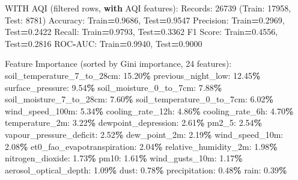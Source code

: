 \documentclass[
  letterpaper,
  DIV=11,
  numbers=noendperiod]{scrartcl}
\newenvironment{Shaded}{\begin{snugshade}}{\end{snugshade}}
\newcommand{\BuiltInTok}[1]{#1}
\newcommand{\ControlFlowTok}[1]{\textcolor[rgb]{0.13,0.29,0.53}{\textbf{#1}}}
\newcommand{\DecValTok}[1]{\textcolor[rgb]{0.00,0.00,0.81}{#1}}
\newcommand{\FloatTok}[1]{\textcolor[rgb]{0.00,0.00,0.81}{#1}}
\newcommand{\NormalTok}[1]{#1}
\newcommand{\OperatorTok}[1]{\textcolor[rgb]{0.81,0.36,0.00}{\textbf{#1}}}
\begin{document}
\begin{Shaded}
\begin{Highlighting}[]
\NormalTok{WITH AQI (filtered rows, }\ControlFlowTok{with}\NormalTok{ AQI features):}
\NormalTok{  Records: }\DecValTok{26739}\NormalTok{ (Train: }\DecValTok{17958}\NormalTok{, Test: }\DecValTok{8781}\NormalTok{)}
\NormalTok{  Accuracy: Train}\OperatorTok{=}\FloatTok{0.9686}\NormalTok{, Test}\OperatorTok{=}\FloatTok{0.9547}
\NormalTok{  Precision: Train}\OperatorTok{=}\FloatTok{0.2969}\NormalTok{, Test}\OperatorTok{=}\FloatTok{0.2422}
\NormalTok{  Recall: Train}\OperatorTok{=}\FloatTok{0.9793}\NormalTok{, Test}\OperatorTok{=}\FloatTok{0.3362}
\NormalTok{  F1 Score: Train}\OperatorTok{=}\FloatTok{0.4556}\NormalTok{, Test}\OperatorTok{=}\FloatTok{0.2816}
\NormalTok{  ROC}\OperatorTok{{-}}\NormalTok{AUC: Train}\OperatorTok{=}\FloatTok{0.9940}\NormalTok{, Test}\OperatorTok{=}\FloatTok{0.9000}

\NormalTok{  Feature Importance (}\BuiltInTok{sorted}\NormalTok{ by Gini importance, }\DecValTok{24}\NormalTok{ features):}
\NormalTok{    soil\_temperature\_7\_to\_28cm: }\FloatTok{15.20}\OperatorTok{\%}
\NormalTok{    previous\_night\_low: }\FloatTok{12.45}\OperatorTok{\%}
\NormalTok{    surface\_pressure: }\FloatTok{9.54}\OperatorTok{\%}
\NormalTok{    soil\_moisture\_0\_to\_7cm: }\FloatTok{7.88}\OperatorTok{\%}
\NormalTok{    soil\_moisture\_7\_to\_28cm: }\FloatTok{7.60}\OperatorTok{\%}
\NormalTok{    soil\_temperature\_0\_to\_7cm: }\FloatTok{6.02}\OperatorTok{\%}
\NormalTok{    wind\_speed\_100m: }\FloatTok{5.34}\OperatorTok{\%}
\NormalTok{    cooling\_rate\_12h: }\FloatTok{4.86}\OperatorTok{\%}
\NormalTok{    cooling\_rate\_6h: }\FloatTok{4.70}\OperatorTok{\%}
\NormalTok{    temperature\_2m: }\FloatTok{3.22}\OperatorTok{\%}
\NormalTok{    dewpoint\_depression: }\FloatTok{2.61}\OperatorTok{\%}
\NormalTok{    pm2\_5: }\FloatTok{2.54}\OperatorTok{\%}
\NormalTok{    vapour\_pressure\_deficit: }\FloatTok{2.52}\OperatorTok{\%}
\NormalTok{    dew\_point\_2m: }\FloatTok{2.19}\OperatorTok{\%}
\NormalTok{    wind\_speed\_10m: }\FloatTok{2.08}\OperatorTok{\%}
\NormalTok{    et0\_fao\_evapotranspiration: }\FloatTok{2.04}\OperatorTok{\%}
\NormalTok{    relative\_humidity\_2m: }\FloatTok{1.98}\OperatorTok{\%}
\NormalTok{    nitrogen\_dioxide: }\FloatTok{1.73}\OperatorTok{\%}
\NormalTok{    pm10: }\FloatTok{1.61}\OperatorTok{\%}
\NormalTok{    wind\_gusts\_10m: }\FloatTok{1.17}\OperatorTok{\%}
\NormalTok{    aerosol\_optical\_depth: }\FloatTok{1.09}\OperatorTok{\%}
\NormalTok{    dust: }\FloatTok{0.78}\OperatorTok{\%}
\NormalTok{    precipitation: }\FloatTok{0.48}\OperatorTok{\%}
\NormalTok{    rain: }\FloatTok{0.39}\OperatorTok{\%}


\end{Highlighting}
\end{Shaded}
\end{document}
